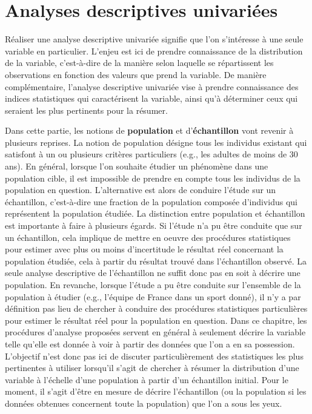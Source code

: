 \documentclass[
  french,
]{book}
\begin{document}
\hypertarget{analyses-descriptives-univariuxe9es}{%
\chapter{Analyses descriptives univariées}\label{analyses-descriptives-univariuxe9es}}

Réaliser une analyse descriptive univariée signifie que l'on s'intéresse à une seule variable en particulier. L'enjeu est ici de prendre connaissance de la distribution de la variable, c'est-à-dire de la manière selon laquelle se répartissent les observations en fonction des valeurs que prend la variable. De manière complémentaire, l'analyse descriptive univariée vise à prendre connaissance des indices statistiques qui caractérisent la variable, ainsi qu'à déterminer ceux qui seraient les plus pertinents pour la résumer.

Dans cette partie, les notions de \textbf{population} et d'\textbf{échantillon} vont revenir à plusieurs reprises. La notion de population désigne tous les individus existant qui satisfont à un ou plusieurs critères particuliers (e.g., les adultes de moins de 30 ans). En général, lorsque l'on souhaite étudier un phénomène dans une population cible, il est impossible de prendre en compte tous les individus de la population en question. L'alternative est alors de conduire l'étude sur un échantillon, c'est-à-dire une fraction de la population composée d'individus qui représentent la population étudiée. La distinction entre population et échantillon est importante à faire à plusieurs égards. Si l'étude n'a pu être conduite que sur un échantillon, cela implique de mettre en oeuvre des procédures statistiques pour estimer avec plus ou moins d'incertitude le résultat réel concernant la population étudiée, cela à partir du résultat trouvé dans l'échantillon observé. La seule analyse descriptive de l'échantillon ne suffit donc pas en soit à décrire une population. En revanche, lorsque l'étude a pu être conduite sur l'ensemble de la population à étudier (e.g., l'équipe de France dans un sport donné), il n'y a par définition pas lieu de chercher à conduire des procédures statistiques particulières pour estimer le résultat réel pour la population en question. Dans ce chapitre, les procédures d'analyse proposées servent en général à seulement décrire la variable telle qu'elle est donnée à voir à partir des données que l'on a en sa possession. L'objectif n'est donc pas ici de discuter particulièrement des statistiques les plus pertinentes à utiliser lorsqu'il s'agit de chercher à résumer la distribution d'une variable à l'échelle d'une population à partir d'un échantillon initial. Pour le moment, il s'agit d'être en mesure de décrire l'échantillon (ou la population si les données obtenues concernent toute la population) que l'on a sous les yeux.
\end{document}
